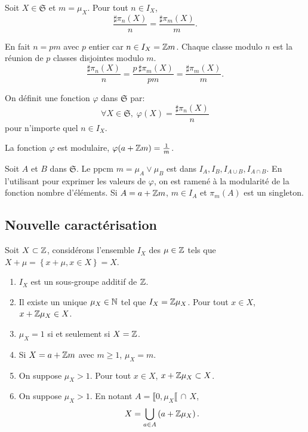 \begin{lem}
  Soit $X\in \mathfrak{S}$ et $m=\mu_X$. Pour tout $n\in I_X$,
  \begin{displaymath}
      \frac{\sharp \pi_n(X)}{n} = \frac{\sharp \pi_m(X)}{m}.
  \end{displaymath}
\end{lem}
\begin{demo}
  En fait $n = pm$ avec $p$ entier car $n \in I_X = \mathbb{Z} m$. Chaque classe modulo $n$ est la réunion de $p$ classes disjointes modulo $m$.
  \begin{displaymath}
    \frac{\sharp \pi_n(X)}{n} = \frac{p \, \sharp \pi_m(X)}{ p m} = \frac{\sharp \pi_m(X)}{m}.
  \end{displaymath}
\end{demo}
\begin{defi}\label{defPhi}
  On définit une fonction $\varphi$ dans $\mathfrak{S}$ par:
  \begin{displaymath}
    \forall X \in \mathfrak{S}, \; \varphi(X) = \frac{\sharp \pi_n(X)}{n}
  \end{displaymath}
pour n'importe quel $n\in I_X$.
\end{defi}
\begin{prop}
  La fonction $\varphi$ est modulaire, $\varphi(a + \mathbb{Z} m) = \frac{1}{m}$.
\end{prop}
\begin{demo}
  Soit $A$ et $B$ dans $\mathfrak{S}$. Le ppcm $m = \mu_A \vee \mu_B$ est dans $I_A, I_B, I_{A\cup B}, I_{A\cap B}$. En l'utilisant pour exprimer les valeurs de $\varphi$, on est ramené à la modularité de la fonction nombre d'éléments.\newline
  Si $A= a + \mathbb{Z} m$, $m \in I_A$ et $\pi_m(A)$ est un singleton.
\end{demo}

\subsection{Nouvelle caractérisation}
Soit $X \subset \mathbb{Z}$, considérons l'ensemble $I_X$ des $\mu \in \mathbb{Z}$ tels que $X + \mu =\left\lbrace x + \mu , x\in X\right\rbrace = X$.
\begin{rems}
  \begin{enumerate}
    \item $I_X$ est un sous-groupe additif de $\mathbb{Z}$.
    \item Il existe un unique $\mu_X \in \mathbb{N}$ tel que $I_X = \mathbb{Z} \mu_X$. Pour tout $x\in X$, $x + \mathbb{Z} \mu_X \in X$.
    \item $\mu_X = 1$ si et seulement si $X=\mathbb{Z}$.
    \item Si $X = a + \mathbb{Z} m$ avec $m \geq 1$, $\mu_X = m$.
    \item On suppose $\mu_X > 1$. Pour tout $x \in X$, $x + \mathbb{Z} \mu_X \subset X$.
    \item On suppose $\mu_X > 1$. En notant $A  = \llbracket 0 , \mu_X \llbracket \, \cap \, X$,
\begin{displaymath}
  X = \bigcup_{a \in A}\left(a + \mathbb{Z} \mu_X\right).
\end{displaymath}
  \end{enumerate}
\end{rems}


